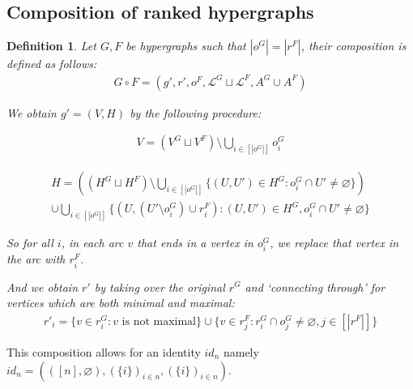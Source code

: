 \documentclass[12pt]{article}
\newtheorem{definition}{Definition}[section]
\newcommand{\defeq}{\vcentcolon=}
\newcommand{\1}{\mathbbm{1}}
\renewcommand{\L}{\mathcal{L}}
\begin{document}
\subsection{Composition of ranked hypergraphs}
\begin{definition}
Let $G, F$ be hypergraphs such that $|o^G| = |r^F|$, their composition is defined as follows:
\begin{align}
    G\circ F = (g', r', o^F, \L^G\sqcup \L^F, A^G\cup A^F)
\end{align}

We obtain $g' = (V,H)$ by the following procedure:

\begin{align*}
    V = (V^G\sqcup V^F) \setminus \bigcup_{i\in [|o^G|]}o^G_i
\end{align*}

\begin{align*}
    H = ((H^G \sqcup H^F) \setminus \bigcup_{i\in [|o^G|]}\{(U, U') \in H^G : o^G_i \cap U' \neq \varnothing\})\\
    \cup \bigcup_{i\in [|o^G|]}\{(U, (U' \setminus o_i^G)\cup r_i^F) :  (U,U') \in H^G, o^G_i \cap U' \neq \varnothing\}
\end{align*}

So for all $i$, in each arc $v$ that ends in a vertex in $o_i^G$, we replace that vertex in the arc with $r_i^F$. 

And we obtain $r'$ by taking over the original $r^G$ and `connecting through' for vertices which are both minimal and maximal:
\begin{align*}
    r'_i = \{v\in r_i^G: v \text{ is not maximal}\}\cup \{v\in r_j^F : r^G_i \cap o_j^G \neq \varnothing,  j\in[|r^F|]\}
\end{align*}
\end{definition}

This composition allows for an identity $id_n$ namely $id_n = (([n], \varnothing), (\{i\})_{i\in n}, (\{i\})_{i\in n})$.\vspace{5pt}
\end{document}
